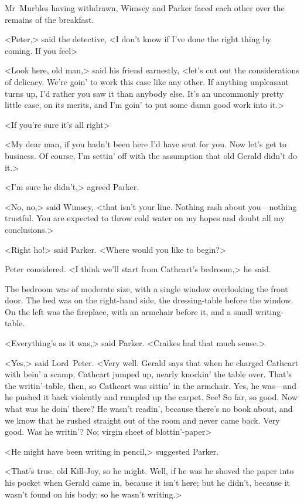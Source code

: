 Mr~Murbles having withdrawn, Wimsey and Parker faced each other over the remains of the breakfast.

<Peter,> said the detective, <I don't know if I've done the right thing by coming. If you feel\longdash>

<Look here, old man,> said his friend earnestly, <let's cut out the considerations of delicacy. We're goin' to work this case like any other. If anything unpleasant turns up, I'd rather you saw it than anybody else. It's an uncommonly pretty little case, on its merits, and I'm goin' to put some damn good work into it.>

<If you're sure it's all right\longdash>

<My dear man, if you hadn't been here I'd have sent for you. Now let's get to business. Of course, I'm settin' off with the assumption that old Gerald didn't do it.>

<I'm sure he didn't,> agreed Parker.

<No, no,> said Wimsey, <that isn't your line. Nothing rash about you—nothing trustful. You are expected to throw cold water on my hopes and doubt all my conclusions.>

<Right ho!> said Parker. <Where would you like to begin?>

Peter considered. <I think we'll start from Cathcart's bedroom,> he said.

The bedroom was of moderate size, with a single window overlooking the front door. The bed was on the right-hand side, the dressing-table before the window. On the left was the fireplace, with an armchair before it, and a small writing-table.

<Everything's as it was,> said Parker. <Craikes had that much sense.>

<Yes,> said Lord~Peter. <Very well. Gerald says that when he charged Cathcart with bein' a scamp, Cathcart jumped up, nearly knockin' the table over. That's the writin'-table, then, so Cathcart was sittin' in the armchair. Yes, he was—and he pushed it back violently and rumpled up the carpet. See! So far, so good. Now what was he doin' there? He wasn't readin', because there's no book about, and we know that he rushed straight out of the room and never came back. Very good. Was he writin'? No; virgin sheet of blottin'-paper\longdash>

<He might have been writing in pencil,> suggested Parker.

<That's true, old Kill-Joy, so he might. Well, if he was he shoved the paper into his pocket when Gerald came in, because it isn't here; but he didn't, because it wasn't found on his body; so he wasn't writing.>

